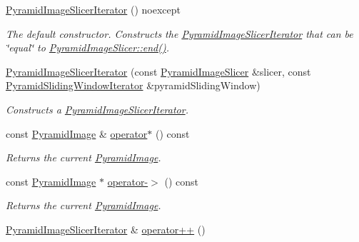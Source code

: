 \begin{DoxyCompactItemize}
\item 
\hyperlink{group___imagery_module_gab8b3f9886530d00229870234b0457e5a}{Pyramid\+Image\+Slicer\+Iterator} () noexcept
\begin{DoxyCompactList}\small\item\em The default constructor. Constructs the \hyperlink{classdg_1_1deepcore_1_1imagery_1_1_pyramid_image_slicer_iterator}{Pyramid\+Image\+Slicer\+Iterator} that can be \char`\"{}equal\char`\"{} to \hyperlink{group___imagery_module_ga6956abd01339df9e8c60963702ce3543}{Pyramid\+Image\+Slicer\+::end()}. \end{DoxyCompactList}\item 
\hyperlink{group___imagery_module_gae2892ba870dde12cc9fe000bd8ef35b4}{Pyramid\+Image\+Slicer\+Iterator} (const \hyperlink{classdg_1_1deepcore_1_1imagery_1_1_pyramid_image_slicer}{Pyramid\+Image\+Slicer} \&slicer, const \hyperlink{classdg_1_1deepcore_1_1imagery_1_1_pyramid_sliding_window_iterator}{Pyramid\+Sliding\+Window\+Iterator} \&pyramid\+Sliding\+Window)
\begin{DoxyCompactList}\small\item\em Constructs a \hyperlink{classdg_1_1deepcore_1_1imagery_1_1_pyramid_image_slicer_iterator}{Pyramid\+Image\+Slicer\+Iterator}. \end{DoxyCompactList}\item 
const \hyperlink{structdg_1_1deepcore_1_1imagery_1_1_pyramid_image}{Pyramid\+Image} \& \hyperlink{group___imagery_module_ga600dc58ba1610e9a397382f55c394c19}{operator$\ast$} () const 
\begin{DoxyCompactList}\small\item\em Returns the current \hyperlink{structdg_1_1deepcore_1_1imagery_1_1_pyramid_image}{Pyramid\+Image}. \end{DoxyCompactList}\item 
const \hyperlink{structdg_1_1deepcore_1_1imagery_1_1_pyramid_image}{Pyramid\+Image} $\ast$ \hyperlink{group___imagery_module_gaf104201dafb494801f82aa216e2ea012}{operator-\/$>$} () const 
\begin{DoxyCompactList}\small\item\em Returns the current \hyperlink{structdg_1_1deepcore_1_1imagery_1_1_pyramid_image}{Pyramid\+Image}. \end{DoxyCompactList}\item 
\hyperlink{classdg_1_1deepcore_1_1imagery_1_1_pyramid_image_slicer_iterator}{Pyramid\+Image\+Slicer\+Iterator} \& \hyperlink{group___imagery_module_ga5457c55fb683845dcd2735e8d37fe18c}{operator++} ()

\end{DoxyCompactItemize}
